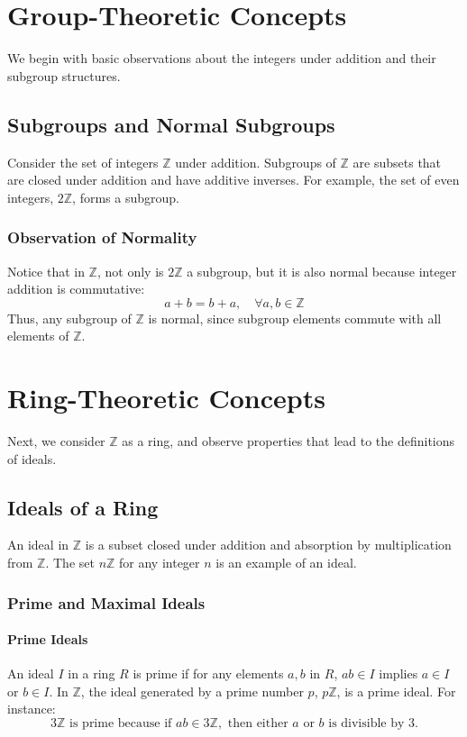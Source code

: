 \documentclass[11pt,openany]{article}
\begin{document}
\section{Group-Theoretic Concepts}
We begin with basic observations about the integers under addition and their subgroup structures.

\subsection{Subgroups and Normal Subgroups}
Consider the set of integers \( \mathbb{Z} \) under addition. Subgroups of \( \mathbb{Z} \) are subsets that are closed under addition and have additive inverses. For example, the set of even integers, \( 2\mathbb{Z} \), forms a subgroup.

\subsubsection{Observation of Normality}
Notice that in \( \mathbb{Z} \), not only is \( 2\mathbb{Z} \) a subgroup, but it is also normal because integer addition is commutative:
\[
a + b = b + a, \quad \forall a, b \in \mathbb{Z}
\]
Thus, any subgroup of \( \mathbb{Z} \) is normal, since subgroup elements commute with all elements of \( \mathbb{Z} \).

\section{Ring-Theoretic Concepts}
Next, we consider \( \mathbb{Z} \) as a ring, and observe properties that lead to the definitions of ideals.

\subsection{Ideals of a Ring}
An ideal in \( \mathbb{Z} \) is a subset closed under addition and absorption by multiplication from \( \mathbb{Z} \). The set \( n\mathbb{Z} \) for any integer \( n \) is an example of an ideal.

\subsubsection{Prime and Maximal Ideals}
\paragraph{Prime Ideals}
An ideal \( I \) in a ring \( R \) is prime if for any elements \( a, b \) in \( R \), \( ab \in I \) implies \( a \in I \) or \( b \in I \). In \( \mathbb{Z} \), the ideal generated by a prime number \( p \), \( p\mathbb{Z} \), is a prime ideal. For instance:
\[
3\mathbb{Z} \text{ is prime because if } ab \in 3\mathbb{Z}, \text{ then either } a \text{ or } b \text{ is divisible by } 3.
\]
\end{document}
